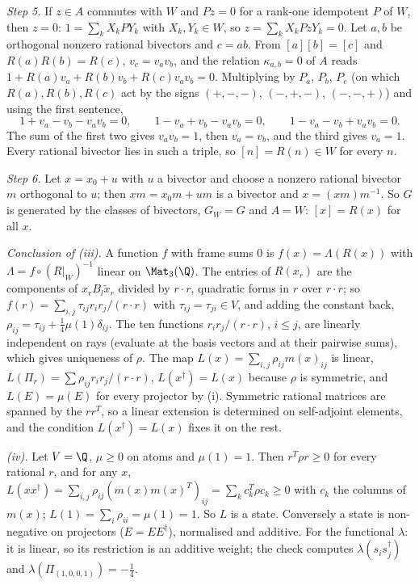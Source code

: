 \emph{Step 5.} If $z \in A$ commutes with $W$ and $Pz = 0$ for a rank-one idempotent $P$ of $W$, then $z = 0$: $1 = \sum_{k}X_{k}PY_{k}$ with $X_{k}, Y_{k} \in W$, so $z = \sum_{k}X_{k}PzY_{k} = 0$. Let $a, b$ be orthogonal nonzero rational bivectors and $c = ab$. From $[a][b] = [c]$ and $R(a)R(b) = R(c)$, $v_{c} = v_{a}v_{b}$, and the relation $\kappa_{a,b} = 0$ of $A$ reads $1 + R(a)v_{a} + R(b)v_{b} + R(c)v_{a}v_{b} = 0$. Multiplying by $P_{a}$, $P_{b}$, $P_{c}$ (on which $R(a), R(b), R(c)$ act by the signs $(+,-,-)$, $(-,+,-)$, $(-,-,+)$) and using the first sentence,
\[
1 + v_{a} - v_{b} - v_{a}v_{b} = 0, \qquad 1 - v_{a} + v_{b} - v_{a}v_{b} = 0, \qquad 1 - v_{a} - v_{b} + v_{a}v_{b} = 0 .
\]
The sum of the first two gives $v_{a}v_{b} = 1$, then $v_{a} = v_{b}$, and the third gives $v_{a} = 1$. Every rational bivector lies in such a triple, so $[n] = R(n) \in W$ for every $n$.

\emph{Step 6.} Let $x = x_{0} + u$ with $u$ a bivector and choose a nonzero rational bivector $m$ orthogonal to $u$; then $xm = x_{0}m + um$ is a bivector and $x = (xm)m^{-1}$. So $G$ is generated by the classes of bivectors, $G_{W} = G$ and $A = W$: $[x] = R(x)$ for all $x$.

\emph{Conclusion of (iii).} A function $f$ with frame sums $0$ is $f(x) = \Lambda(R(x))$ with $\Lambda = f \circ (R|_{W})^{-1}$ linear on $\Mat_{3}(\Q)$. The entries of $R(x_{r})$ are the components of $x_{r}B_{l}\tilde{x}_{r}$ divided by $r \cdot r$, quadratic forms in $r$ over $r \cdot r$; so $f(r) = \sum_{i,j}\tau_{ij}r_{i}r_{j}/(r \cdot r)$ with $\tau_{ij} = \tau_{ji} \in V$, and adding the constant back, $\rho_{ij} = \tau_{ij} + \tfrac14\mu(1)\delta_{ij}$. The ten functions $r_{i}r_{j}/(r \cdot r)$, $i \le j$, are linearly independent on rays (evaluate at the basis vectors and at their pairwise sums), which gives uniqueness of $\rho$. The map $L(x) = \sum_{i,j}\rho_{ij}m(x)_{ij}$ is linear, $L(\Pi_{r}) = \sum\rho_{ij}r_{i}r_{j}/(r \cdot r)$, $L(x^{\dagger}) = L(x)$ because $\rho$ is symmetric, and $L(E) = \mu(E)$ for every projector by (i). Symmetric rational matrices are spanned by the $rr^{T}$, so a linear extension is determined on self-adjoint elements, and the condition $L(x^{\dagger}) = L(x)$ fixes it on the rest.

\emph{(iv).} Let $V = \Q$, $\mu \ge 0$ on atoms and $\mu(1) = 1$. Then $r^{T}\rho r \ge 0$ for every rational $r$, and for any $x$, $L(xx^{\dagger}) = \sum_{i,j}\rho_{ij}(m(x)m(x)^{T})_{ij} = \sum_{k}c_{k}^{T}\rho c_{k} \ge 0$ with $c_{k}$ the columns of $m(x)$; $L(1) = \sum_{i}\rho_{ii} = \mu(1) = 1$. So $L$ is a state. Conversely a state is non-negative on projectors ($E = EE^{\dagger}$), normalised and additive. For the functional $\lambda$: it is linear, so its restriction is an additive weight; the check computes $\lambda(s_{i}s_{j}^{\dagger})$ and $\lambda(\Pi_{(1,0,0,1)}) = -\tfrac14$.

